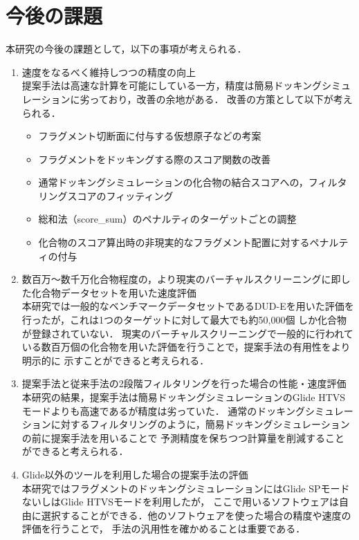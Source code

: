 \newpage

\section{今後の課題}
本研究の今後の課題として，以下の事項が考えられる．
\begin{enumerate}
\item 速度をなるべく維持しつつの精度の向上\\
	提案手法は高速な計算を可能にしている一方，精度は簡易ドッキングシミュレーションに劣っており，改善の余地がある．
	改善の方策として以下が考えられる．
	\begin{itemize}
	\item フラグメント切断面に付与する仮想原子などの考案
	\item フラグメントをドッキングする際のスコア関数の改善
	\item 通常ドッキングシミュレーションの化合物の結合スコアへの，フィルタリングスコアのフィッティング
	\item 総和法（score\_sum）のペナルティのターゲットごとの調整
	\item 化合物のスコア算出時の非現実的なフラグメント配置に対するペナルティの付与
	\end{itemize}
\item 数百万～数千万化合物程度の，より現実のバーチャルスクリーニングに即した化合物データセットを用いた速度評価\\
	本研究では一般的なベンチマークデータセットであるDUD-Eを用いた評価を行ったが，これは1つのターゲットに対して最大でも約50,000個
	しか化合物が登録されていない．
	現実のバーチャルスクリーニングで一般的に行われている数百万個の化合物を用いた評価を行うことで，提案手法の有用性をより明示的に
	示すことができると考えられる．
\item 提案手法と従来手法の2段階フィルタリングを行った場合の性能・速度評価\\
	本研究の結果，提案手法は簡易ドッキングシミュレーションのGlide HTVSモードよりも高速であるが精度は劣っていた．
	通常のドッキングシミュレーションに対するフィルタリングのように，簡易ドッキングシミュレーションの前に提案手法を用いることで
	予測精度を保ちつつ計算量を削減することができると考えられる．
\item Glide以外のツールを利用した場合の提案手法の評価\\
	本研究ではフラグメントのドッキングシミュレーションにはGlide SPモードないしはGlide HTVSモードを利用したが，
	ここで用いるソフトウェアは自由に選択することができる．他のソフトウェアを使った場合の精度や速度の評価を行うことで，
	手法の汎用性を確かめることは重要である．
\end{enumerate}
